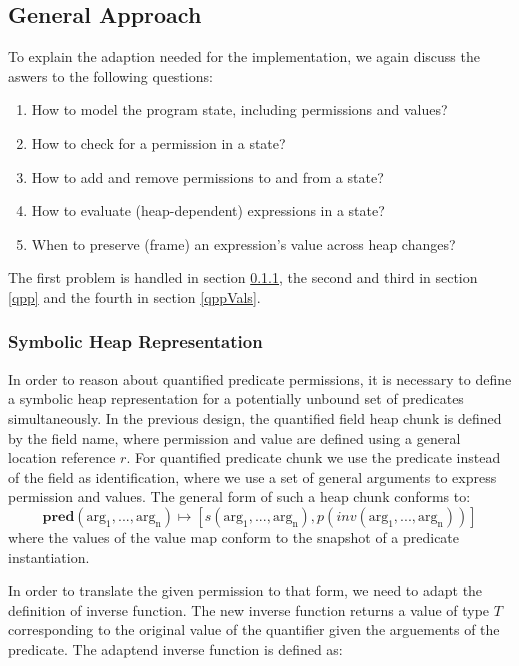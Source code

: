 \documentclass[12pt]{article}
\begin{document}
\subsection{General Approach}
To explain the adaption needed for the implementation, we again discuss the aswers to the following questions:
\begin{enumerate}
\item How to model the program state, including permissions and values?
\item How to check for a permission in a state?
\item How to add and remove permissions to and from a state?
\item How to evaluate (heap-dependent) expressions in a state?
\item When to preserve (frame) an expression's value across heap changes?
\end{enumerate}

The first problem is handled in section \ref{shr}, the second and third in section \ref{qpp} and the fourth in section \ref{qppVals}. 

\subsubsection{Symbolic Heap Representation} \label{shr}
In order to reason about quantified predicate permissions, it is necessary to define a symbolic heap representation for a potentially unbound set of predicates simultaneously. In the previous design, the quantified field heap chunk is defined by the field name, where permission and value are defined using a general location reference \(r\).
For quantified predicate chunk we use the predicate instead of the field as identification, where we use a set of general arguments to express permission and values. The general form of such a heap chunk conforms to:
\begin{equation}
	\mathbf{pred}(\mathrm{arg_1, ..., arg_n})\mapsto [s(\mathrm{arg_1, ..., arg_n}), p(inv(\mathrm{arg_1, ..., arg_n}))]
\end{equation}
where the values of the value map conform to the snapshot of a predicate instantiation.

In order to translate the given permission to that form, we need to adapt the definition of inverse function. The new inverse function returns a value of type \(T\) corresponding to the original value of the quantifier given the arguements of the predicate. The adaptend inverse function is defined as:\\
\end{document}
